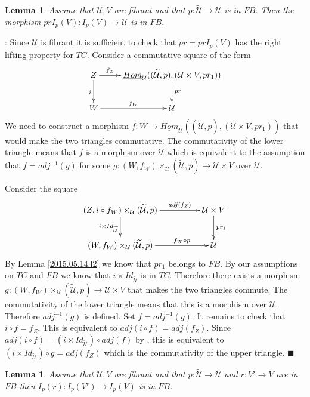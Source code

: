 \documentclass[12pt]{article}
\numberwithin{equation}{section}
\newenvironment{myproof}{{\bf Proof}:}{$\blacksquare$ \vskip 5mm }
\newtheorem{lemma}[proposition]{Lemma}
\newcommand{\llabel}[1]{\label{#1}}
\newcommand{\sr}{\rightarrow}
\newcommand{\uu}{\underline}
\newcommand{\iHom}{\uu{Hom}}
\newcommand{\wt}{\widetilde}
\newcommand{\dd}{\diamond}
\newcommand{\U}{\mathcal{U}}
\begin{document}
%
\begin{lemma}
\llabel{2015.05.14.l1} Assume that $\U,V$ are fibrant and that $p:\wt{\U}\sr \U$
is in $FB$. Then the morphism $prI_p(V):I_p(V)\sr \U$ is in $FB$.
\end{lemma}
%
\begin{myproof}
Since $\U$ is fibrant it is sufficient to check that $pr=prI_p(V)$ has the right
lifting property for $TC$. Consider a commutative square of the form
%
$$
\begin{xy}
          \xymatrix@C=2pc{ Z \ar[r]^-{f_Z} \ar[d]_{i} &
            \iHom_\U((\wt{\U},p),(\U\times V,pr_1)) \ar[d]^{pr}\\ W
            \ar[r]^-{f_W} & \U }
\end{xy}
$$
%
We need to construct a morphism $f:W\sr \iHom_\U((\wt{\U},p),(\U\times
V,pr_1))$ that would make the two triangles commutative. The commutativity of
the lower triangle means that $f$ is a morphism over $\U$ which is equivalent to
the assumption that $f=adj^{-1}(g)$ for some $g:(W,f_W)\times_\U (\wt{\U},p)\sr
\U\times V$ over $\U$.

Consider the square
%
$$
\begin{xy}
          \xymatrix@C=4pc{ (Z, i\circ f_W)\times_\U (\wt{\U},p)
            \ar[r]^-{adj(f_Z)} \ar[d]_{i\times Id_{\wt{\U}}} & \U\times V
            \ar[d]^{pr_1}\\ (W,f_W)\times_\U (\wt{\U},p) \ar[r]^-{f_W\dd p} & \U }
\end{xy}
$$
%
By Lemma \ref{2015.05.14.l2} we know that $pr_1$ belongs to $FB$. By our
assumptions on $TC$ and $FB$ we know that $i\times Id_{\wt{\U}}$ is in
$TC$. Therefore there exists a morphism $g:(W,f_W)\times_\U (\wt{\U},p) \sr
\U\times V$ that makes the two triangles commute.  The commutativity of the
lower triangle means that this is a morphism over $\U$. Therefore $adj^{-1}(g)$
is defined. Set $f=adj^{-1}(g)$. It remains to check that $i\circ f=f_Z$. This
is equivalent to $adj(i\circ f)=adj(f_Z)$. Since $adj(i\circ f)=(i\times
Id_{\wt{\U}})\circ adj(f)$ by \cite[Lemma 8.7(3)]{fromunivwithPi}, this is
equivalent to $(i\times Id_{\wt{\U}})\circ g=adj(f_Z)$ which is the
commutativity of the upper triangle.
\end{myproof}
%
\begin{lemma}
\llabel{2015.05.14.l3} Assume that $\U,V$ are fibrant and that $p:\wt{\U}\sr \U$
and $r:V'\sr V$ are in $FB$ then $I_p(r):I_p(V')\sr I_p(V)$ is in $FB$.
\end{lemma}
%
\end{document}
